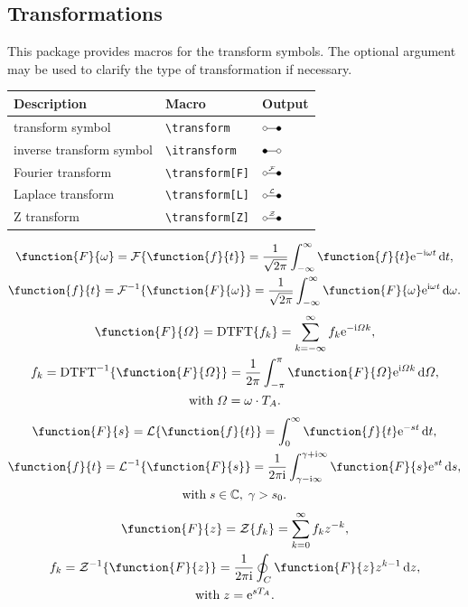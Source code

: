\documentclass[DIV=13]{scrartcl}
\begin{document}
\subsection{Transformations}
This package provides macros for the transform symbols. The optional argument
may be used to clarify the type of transformation if necessary.
\begin{center}
  \begin{tabular}{lll}
    \toprule
    \textbf{Description}     & \textbf{Macro}       & \textbf{Output} \\
    \midrule
    transform symbol         & \verb|\transform|    & $\transform$    \\
    inverse transform symbol & \verb|\itransform|   & $\itransform$   \\
    \midrule
    Fourier transform        & \verb|\transform[F]| & $\transform[F]$ \\
    Laplace transform        & \verb|\transform[L]| & $\transform[L]$ \\
    Z transform              & \verb|\transform[Z]| & $\transform[Z]$ \\
    \bottomrule
  \end{tabular}
\end{center}
\begin{gather}
  \function{F}{\omega} = \mathcal{F}\left\lbrace\function{f}{t}\right\rbrace
  = \frac{1}{\sqrt{2\pi}}\int_{-\infty}^{\infty}
  \function{f}{t}\e^{-\i\omega t} \diff t, \\
  \function{f}{t} = \mathcal{F}^\inv\lbrace\function{F}{\omega}\rbrace
  = \frac{1}{\sqrt{2\pi}}\int_{-\infty}^{\infty}
  \function{F}{\omega}\e^{\i\omega t} \diff \omega.
\end{gather}
\begin{gather}
  \function{F}{\varOmega} = \mathrm{DTFT}\lbrace f_k \rbrace
  = \sum_{k=-\infty}^\infty f_k \e^{-\i\varOmega k}, \\
  f_k = \mathrm{DTFT}^\inv\lbrace\function{F}{\varOmega}\rbrace
  = \frac{1}{2\pi}\int_{-\pi}^{\pi}
  \function{F}{\varOmega}\e^{\i\varOmega k} \diff \varOmega, \\
  \mathrm{with}\;\varOmega = \omega\cdot T_A.
\end{gather}
\begin{gather}
  \function{F}{s} = \mathcal{L}\lbrace\function{f}{t}\rbrace
  = \int_0^\infty \function{f}{t}\e^{-st}\diff t, \\
  \function{f}{t} = \mathcal{L}^\inv\lbrace\function{F}{s}\rbrace
  = \frac{1}{2\pi\i}\int_{\gamma-\i\infty}^{\gamma+\i\infty}
  \function{F}{s}\e^{st} \diff s, \\
  \mathrm{with}\; s\in\Cnums,\; \gamma > \Re{s_0}.
\end{gather}
\begin{gather}
  \function{F}{z} = \mathcal{Z}\lbrace f_k \rbrace
  = \sum_{k=0}^\infty f_k z^{-k}, \\
  f_k = \mathcal{Z}^\inv\lbrace\function{F}{z}\rbrace
  = \frac{1}{2\pi\i}\oint_C \function{F}{z} z^{k-1} \diff z, \\
  \mathrm{with}\; z = \e^{sT_A}.
\end{gather}
\end{document}
